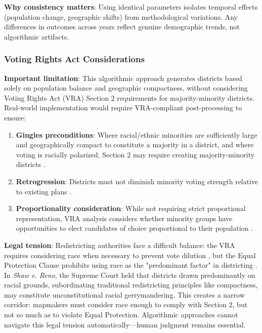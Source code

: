 \textbf{Why consistency matters}: Using identical parameters isolates temporal effects (population change, geographic shifts) from methodological variations. Any differences in outcomes across years reflect genuine demographic trends, not algorithmic artifacts.

\subsubsection{Voting Rights Act Considerations}

\textbf{Important limitation}: This algorithmic approach generates districts based solely on population balance and geographic compactness, without considering Voting Rights Act (VRA) Section 2 requirements for majority-minority districts. Real-world implementation would require VRA-compliant post-processing to ensure:

\begin{enumerate}
    \item \textbf{Gingles preconditions}: Where racial/ethnic minorities are sufficiently large and geographically compact to constitute a majority in a district, and where voting is racially polarized, Section 2 may require creating majority-minority districts \citep{gingles1986}.
    \item \textbf{Retrogression}: Districts must not diminish minority voting strength relative to existing plans \citep{beer1976}.
    \item \textbf{Proportionality consideration}: While not requiring strict proportional representation, VRA analysis considers whether minority groups have opportunities to elect candidates of choice proportional to their population \citep{johnson1997}.
\end{enumerate}

\textbf{Legal tension}: Redistricting authorities face a difficult balance: the VRA requires considering race when necessary to prevent vote dilution \citep{gingles1986}, but the Equal Protection Clause prohibits using race as the "predominant factor" in districting \citep{shaw1993}. In \textit{Shaw v. Reno}, the Supreme Court held that districts drawn predominantly on racial grounds, subordinating traditional redistricting principles like compactness, may constitute unconstitutional racial gerrymandering. This creates a narrow corridor: mapmakers must consider race enough to comply with Section 2, but not so much as to violate Equal Protection. Algorithmic approaches cannot navigate this legal tension automatically—human judgment remains essential.

